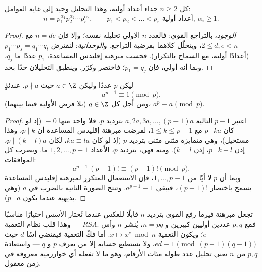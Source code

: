 \begin{theorem}\label{thm:g12:arith:fta}
كل  $n \geq 2$ جداء أعداد أولية، وهذا التحليل
وحيد إلى غاية  العوامل:
\[
n = p_1^{\alpha_1} p_2^{\alpha_2} \cdots p_r^{\alpha_r},
\qquad p_1 < p_2 < \dots < p_r \text{ أعداد أولية},\ \alpha_i \geq 1 .
\]
\end{theorem}

\begin{proof}
\emph{الوجود}، بالتراجع القوي: فالعدد $n$ الأولي تحليله نفسه؛
وإلا فإن $n = de$ مع $2 \leq d, e < n$، ويتحلّل كلاهما بفرضية
التراجع. و\emph{الوحدانية}: لنفترض
$p_1\cdots p_s = q_1 \cdots q_t$ (أعدادًا أولية، مع السماح بالتكرار). فحسب
مبرهنة إقليدس المساعدة،  $p_1$ عددًا ما $q_j$، وبما أنه أولي، فإن $p_1 = q_j$؛
فاختصر وكرّر. وينطبق التحليلان حدًا بحد.
\end{proof}

\begin{theorem}\label{thm:g12:arith:fermat}
ليكن $p$ عددًا  وليكن $a \in \Z$ حيث $p \nmid a$. عندئذٍ
\[
a^{p-1} \equiv 1 \pmod p .
\]
ومن أجل كل $a \in \Z$ (بلا فرض الأولية فيما بينهما)، $a^p \equiv a \pmod p$.
\end{theorem}

\begin{proof}
اعتبر  $p - 1$ التالية $a, 2a, 3a, \dots, (p-1)a$ بترديد $p$. فلا واحد منها
$\equiv 0$ (إذ لو كان $p \mid ka$ مع $1 \leq k \leq p-1$، لفرضت مبرهنة إقليدس المساعدة
أن $p \mid k$، وهذا مستحيل)، وهي متمايزة مثنى مثنى بترديد $p$ (إذ لو كان
$ka \equiv la$، لكان $p \mid (k - l)a$، إذن $p \mid k - l$، إذن $k = l$).
ومنه فهي، بترديد $p$، الأعداد $1, 2, \dots, p-1$  ما.
وبضرب كل الموافقات:
\[
a^{p-1}\,(p-1)! \equiv (p-1)! \pmod p .
\]
وبما أن $p$ لا  أيًا من $1, \dots, p-1$، فإن الاستعمال المتكرر لمبرهنة إقليدس المساعدة
يسمح باختصار $(p-1)!$، فيبقى $a^{p-1} \equiv 1$. وتنتج الصورة الثانية
بالضرب في $a$ (وهي بديهية عندما يكون $p \mid a$).
\end{proof}

\begin{example}\label{ex:g12:arith:rsa}
تجعل مبرهنة فيرما رفع القوى بترديد $n$ قابلًا للعكس عندما تُختار
الأسس اختيارًا مناسبًا --- وهذا قلب نظام التعمية \emph{RSA}.
فمع $p, q$ عددين أوليين كبيرين و $n = pq$، يُنشَر $n$ وأس
$e$؛ ويكون التعمية $x \mapsto x^e \bmod n$. أما فكّ التعمية فيقتضي أسًا
$d$ حيث $ed \equiv 1 \pmod{(p-1)(q-1)}$، ولا يستطيع حسابه إلا من يعرف $p$
و $q$ --- واستعادة $p, q$ من $n$ تعني تحليل عدد
طوله مئات الأرقام، وهو ما لا تفعله أي خوارزمية معروفة في زمن
معقول.
\end{example}

